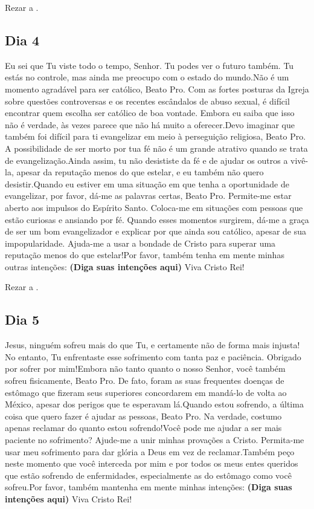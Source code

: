 \documentclass[a4paper,14pt,twoside]{extarticle} \usepackage[utf8]{inputenc}
\begin{document}
Rezar a \textbf{}.

\subsection{Dia 4}


Eu sei que Tu viste todo o tempo, Senhor. Tu podes ver o futuro também. Tu estás no controle, mas ainda me preocupo com o estado do mundo.Não é um momento agradável para ser católico, Beato Pro. Com as fortes posturas da Igreja sobre questões controversas e os recentes escândalos de abuso sexual, é difícil encontrar quem escolha ser católico de boa vontade. Embora eu saiba que isso não é verdade, às vezes parece que não há muito a oferecer.Devo imaginar que também foi difícil para ti evangelizar em meio à perseguição religiosa, Beato Pro. A possibilidade de ser morto por tua fé não é um grande atrativo quando se trata de evangelização.Ainda assim, tu não desististe da fé e de ajudar os outros a vivê-la, apesar da reputação menos do que estelar, e eu também não quero desistir.Quando eu estiver em uma situação em que tenha a oportunidade de evangelizar, por favor, dá-me as palavras certas, Beato Pro. Permite-me estar aberto aos impulsos do Espírito Santo. Coloca-me em situações com pessoas que estão curiosas e ansiando por fé. Quando esses momentos surgirem, dá-me a graça de ser um bom evangelizador e explicar por que ainda sou católico, apesar de sua impopularidade. Ajuda-me a usar a bondade de Cristo para superar uma reputação menos do que estelar!Por favor, também tenha em mente minhas outras intenções: \textbf{(Diga suas intenções aqui)} Viva Cristo Rei!

Rezar a \textbf{}.

\subsection{Dia 5}

Jesus, ninguém sofreu mais do que Tu, e certamente não de forma mais injusta! No entanto, Tu enfrentaste esse sofrimento com tanta paz e paciência. Obrigado por sofrer por mim!Embora não tanto quanto o nosso Senhor, você também sofreu fisicamente, Beato Pro. De fato, foram as suas frequentes doenças de estômago que fizeram seus superiores concordarem em mandá-lo de volta ao México, apesar dos perigos que te esperavam lá.Quando estou sofrendo, a última coisa que quero fazer é ajudar as pessoas, Beato Pro. Na verdade, costumo apenas reclamar do quanto estou sofrendo!Você pode me ajudar a ser mais paciente no sofrimento? Ajude-me a unir minhas provações a Cristo. Permita-me usar meu sofrimento para dar glória a Deus em vez de reclamar.Também peço neste momento que você interceda por mim e por todos os meus entes queridos que estão sofrendo de enfermidades, especialmente as do estômago como você sofreu.Por favor, também mantenha em mente minhas intenções: \textbf{(Diga suas intenções aqui)} Viva Cristo Rei!
\end{document}

